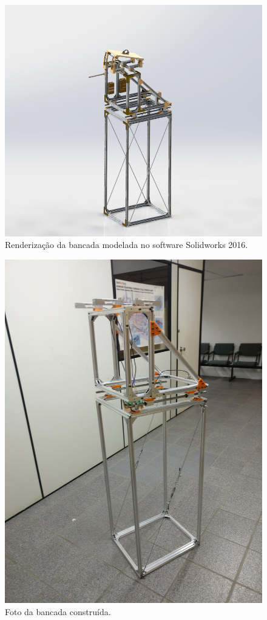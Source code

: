 \begin{figure}[!ht]
    \centering
    \includegraphics[width=.8\linewidth]{figuras/renders/perspectiva_sem_asa_com_pitot.png}
    \caption{Renderização da bancada modelada no software Solidworks 2016\cite{autor}.}
    \label{fig:render_bancada_completa}
\end{figure}

\begin{figure}[!ht]
    \centering
    \includegraphics[width=.8\linewidth]{figuras/construcao/bancada_inteira.jpg}
    \caption{Foto da bancada construída\cite{autor}.}
    \label{fig:bancada_construida}
\end{figure}



